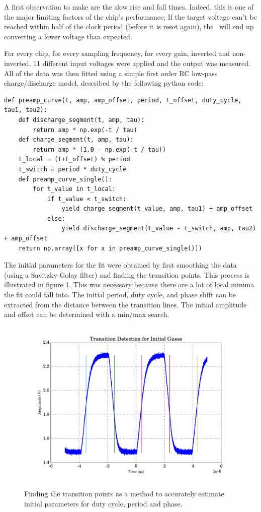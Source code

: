 A first observation to make are the slow rise and fall times. Indeed,  this is
one  of the major limiting factors of the chip's performance;  If  the  target
voltage can't be reached within half of the clock period (before it  is  reset
again),  the  \sdm~will end up  converting  a  lower  voltage  than  expected.

For  every  chip,  for  every sampling frequency, for every gain, inverted and
non-inverted,  11  different  input voltages were applied and the  output  was
measured.  All  of  the  data  was  then fitted using a simple first order  RC
low-pass charge/discharge model, described by the following python code:

\begin{verbatim}
def preamp_curve(t, amp, amp_offset, period, t_offset, duty_cycle, tau1, tau2):
    def discharge_segment(t, amp, tau):
        return amp * np.exp(-t / tau)
    def charge_segment(t, amp, tau):
        return amp * (1.0 - np.exp(-t / tau))
    t_local = (t+t_offset) % period
    t_switch = period * duty_cycle
    def preamp_curve_single():
        for t_value in t_local:
            if t_value < t_switch:
                yield charge_segment(t_value, amp, tau1) + amp_offset
            else:
                yield discharge_segment(t_value - t_switch, amp, tau2) + amp_offset
    return np.array([x for x in preamp_curve_single()])
\end{verbatim}

The initial parameters for the  fit  were obtained by first smoothing the data
(using  a  Savitzky-Golay  filter) and finding  the  transition  points.  This
process is illustrated  in  figure  \ref{fig:transition_detection}.  This  was
necessary because there are a lot of local minima the fit could fall into. The
initial period, duty cycle, and phase shift can be extracted from the distance
between the  transition  lines.  The  initial  amplitude  and  offset  can  be
determined with a min/max search.

\begin{figure}
    \centering
    \includegraphics[width=\linewidth]{images/plots/transition-detection.pdf}
    \caption{Finding the transition points as a method to accurately estimate initial parameters for duty cycle, period and phase.}
    \label{fig:transition_detection}
\end{figure}

